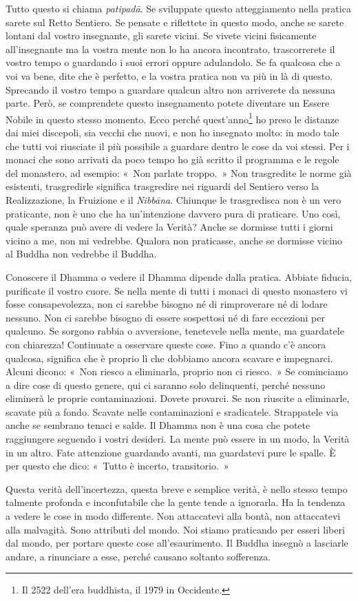 Tutto questo si chiama \emph{patipadā}. Se sviluppate questo
atteggiamento nella pratica sarete sul Retto Sentiero. Se pensate e
riflettete in questo modo, anche se sarete lontani dal vostro
insegnante, gli sarete vicini. Se vivete vicini fisicamente
all'insegnante ma la vostra mente non lo ha ancora incontrato,
trascorrerete il vostro tempo o guardando i suoi errori oppure
adulandolo. Se fa qualcosa che a voi va bene, dite che è perfetto, e la
vostra pratica non va più in là di questo. Sprecando il vostro tempo a
guardare qualcun altro non arriverete da nessuna parte. Però, se
comprendete questo insegnamento potete diventare un Essere Nobile in
questo stesso momento. Ecco perché quest'anno\footnote{Il 2522 dell'era
  buddhista, il 1979 in Occidente.} ho preso le distanze dai miei
discepoli, sia vecchi che nuovi, e non ho insegnato molto: in modo tale
che tutti voi riusciate il più possibile a guardare dentro le cose da
voi stessi. Per i monaci che sono arrivati da poco tempo ho già scritto
il programma e le regole del monastero, ad esempio: «~Non parlate
troppo.~» Non trasgredite le norme già esistenti, trasgredirle significa
trasgredire nei riguardi del Sentiero verso la Realizzazione, la
Fruizione e il \emph{Nibbāna}. Chiunque le trasgredisca non è un vero
praticante, non è uno che ha un'intenzione davvero pura di praticare.
Uno così, quale speranza può avere di vedere la Verità? Anche se
dormisse tutti i giorni vicino a me, non mi vedrebbe. Qualora non
praticasse, anche se dormisse vicino al Buddha non vedrebbe il Buddha.

Conoscere il Dhamma o vedere il Dhamma dipende dalla pratica. Abbiate
fiducia, purificate il vostro cuore. Se nella mente di tutti i monaci di
questo monastero vi fosse consapevolezza, non ci sarebbe bisogno né di
rimproverare né di lodare nessuno. Non ci sarebbe bisogno di essere
sospettosi né di fare eccezioni per qualcuno. Se sorgono rabbia o
avversione, tenetevele nella mente, ma guardatele con chiarezza!
Continuate a osservare queste cose. Fino a quando c'è ancora qualcosa,
significa che è proprio lì che dobbiamo ancora scavare e impegnarci.
Alcuni dicono: «~Non riesco a eliminarla, proprio non ci riesco.~» Se
cominciamo a dire cose di questo genere, qui ci saranno solo
delinquenti, perché nessuno eliminerà le proprie contaminazioni. Dovete
provarci. Se non riuscite a eliminarle, scavate più a fondo. Scavate
nelle contaminazioni e sradicatele. Strappatele via anche se sembrano
tenaci e salde. Il Dhamma non è una cosa che potete raggiungere seguendo
i vostri desideri. La mente può essere in un modo, la Verità in un
altro. Fate attenzione guardando avanti, ma guardatevi pure le spalle. È
per questo che dico: «~Tutto è incerto, transitorio.~»

Questa verità dell'incertezza, questa breve e semplice verità, è nello
stesso tempo talmente profonda e inconfutabile che la gente tende a
ignorarla. Ha la tendenza a vedere le cose in modo differente. Non
attaccatevi alla bontà, non attaccatevi alla malvagità. Sono attributi
del mondo. Noi stiamo praticando per esseri liberi dal mondo, per
portare queste cose all'esaurimento. Il Buddha insegnò a lasciarle
andare, a rinunciare a esse, perché causano soltanto sofferenza.

